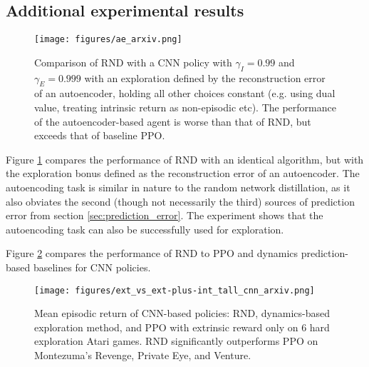 \documentclass{article} \usepackage[dvipsnames]{xcolor}
\begin{document}
\subsection{Additional experimental results}
\label{sec:additional_results}


\begin{figure}[htbp]
\centering
\hspace{.02\textwidth}
\begin{minipage}[t]{0.98\linewidth}
\centering
\texttt{[image: figures/ae\_arxiv.png]}
\end{minipage}\par
\vspace*{-5pt}
\hspace{.02\textwidth}
\begin{minipage}[t]{0.98\linewidth}
\caption{Comparison of RND with a CNN policy with $\gamma_I=0.99$ and $\gamma_E=0.999$ with an exploration defined by the reconstruction error of an autoencoder, holding all other choices constant (e.g. using dual value, treating intrinsic return as non-episodic etc). The performance of the autoencoder-based agent is worse than that of RND, but exceeds that of baseline PPO.}
\label{fig:ae}
\end{minipage}\vspace*{-20pt}
\end{figure}



Figure \ref{fig:ae} compares the performance of RND with an identical algorithm, but with the exploration bonus defined as the reconstruction error of an autoencoder. The autoencoding task is similar in nature to the random network distillation, as it also obviates the second (though not necessarily the third) sources of prediction error from section \ref{sec:prediction_error}. The experiment shows that the autoencoding task can also be successfully used for exploration.

Figure \ref{fig:ext_comparison_cnn} compares the performance of RND to PPO and dynamics prediction-based baselines for CNN policies.

\begin{figure}[h!]
\centering
\texttt{[image: figures/ext\_vs\_ext-plus-int\_tall\_cnn\_arxiv.png]}
\caption{Mean episodic return of CNN-based policies: RND, dynamics-based exploration method, and PPO with extrinsic reward only on 6 hard exploration Atari games. RND significantly outperforms PPO on Montezuma's Revenge, Private Eye, and Venture.}
\label{fig:ext_comparison_cnn}
\vspace*{-8pt}
\end{figure}
\end{document}
